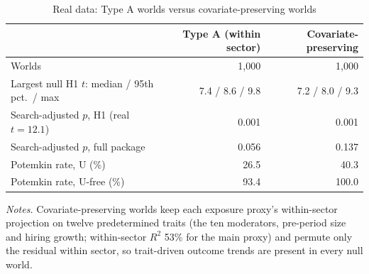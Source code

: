\begin{table}[!htbp]\centering\footnotesize
\caption{Real data: Type A worlds versus covariate-preserving worlds}\label{tab:v_covA}
\begin{tabular}{lrr}
\toprule
 & Type A (within sector) & Covariate-preserving \\
\midrule
Worlds & 1,000 & 1,000 \\
Largest null H1 $t$: median / 95th pct.\ / max & 7.4 / 8.6 / 9.8 & 7.2 / 8.0 / 9.3 \\
Search-adjusted $p$, H1 (real $t=12.1$) & 0.001 & 0.001 \\
Search-adjusted $p$, full package & 0.056 & 0.137 \\
Potemkin rate, U (\%) & 26.5 & 40.3 \\
Potemkin rate, U-free (\%) & 93.4 & 100.0 \\
\bottomrule
\end{tabular}
\begin{minipage}{0.97\linewidth}\vspace{2pt}\scriptsize\textit{Notes.} Covariate-preserving worlds keep each exposure proxy's within-sector projection on twelve predetermined traits (the ten moderators, pre-period size and hiring growth; within-sector $R^2$ 53\% for the main proxy) and permute only the residual within sector, so trait-driven outcome trends are present in every null world.\end{minipage}
\end{table}